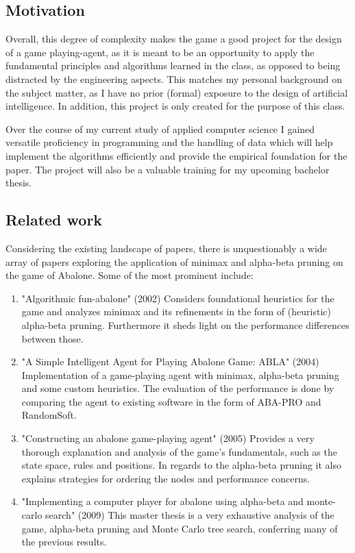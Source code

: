 \documentclass{llncs}
\begin{document}
\subsection{Motivation}
Overall, this degree of complexity makes the game a good project for the design of a game playing-agent, as it is meant to be an opportunity to apply the fundamental principles and algorithms learned in the class, as opposed to being distracted by the engineering aspects. This matches my personal background on the subject matter, as I have no prior (formal) exposure to the design of artificial intelligence. In addition, this project is only created for the purpose of this class.

Over the course of my current study of applied computer science I gained versatile proficiency in programming and the handling of data which will help implement the algorithms efficiently and provide the empirical foundation for the paper. The project will also be a valuable training for my upcoming bachelor thesis.

\subsection{Related work}

Considering the existing landscape of papers, there is unquestionably a wide array of papers exploring the application of minimax and alpha-beta pruning on the game of Abalone. Some of the most prominent include:

\begin{enumerate}
  \item "Algorithmic fun-abalone" (2002) Considers foundational heuristics for the game and analyzes minimax and its refinements in the form of (heuristic) alpha-beta pruning. Furthermore it sheds light on the performance differences between those. \cite{aichholzer_algorithmic_2002}
  \item "A Simple Intelligent Agent for Playing Abalone Game: ABLA" (2004) Implementation of a game-playing agent with minimax, alpha-beta pruning and some custom heuristics. The evaluation of the performance is done by comparing the agent to existing software in the form of ABA-PRO and RandomSoft.\cite{ozcan_simple_2004}
  \item "Constructing an abalone game-playing agent" (2005) Provides a very thorough explanation and analysis of the game's fundamentals, such as the state space, rules and positions. In regards to the alpha-beta pruning it also explains strategies for ordering the nodes and performance concerns. \cite{lemmens_constructing_2005}
  \item "Implementing a computer player for abalone using alpha-beta and monte-carlo search" (2009) This master thesis is a very exhaustive analysis of the game, alpha-beta pruning and Monte Carlo tree search, conferring many of the previous results. \cite{chorus_implementing_2009}
\end{enumerate}
\end{document}

